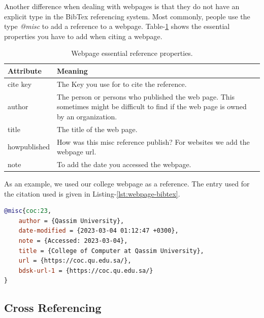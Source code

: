 Another difference when dealing with webpages is that they do not have an explicit type in the BibTex referencing system. Most commonly, people use the type \emph{@misc} to add a reference to a webpage. Table-\ref{tab:webpage-properties} shows the essential properties you have to add when citing a webpage. 

\begin{table}[H]
    \centering
    \begin{tabular}{p{}p{}}
        \hline\hline
        Attribute      & Meaning \\ \hline\hline
        cite key  & The Key you use for to cite the reference.  \\
        author & The person or persons who published the web page. This sometimes might be difficult to find if the web page is owned by an organization. \\
        title & The title of the web page. \\
        howpublished & How was this misc reference publish? For websites we add the webpage url. \\
        note & To add the date you accessed the webpage. \\ \hline
    \end{tabular}
    \caption{Webpage essential reference properties.}
    \label{tab:webpage-properties}
\end{table}

As an example, we used our college webpage \cite{coc:23} as a reference. The entry used for the citation used is given in Listing-\ref{lst:webpage-bibtex}.

\begin{lstlisting}[language=BibTex,style=mystyle,caption={Sample BibTex Reference for A Webpage},label={lst:webpage-bibtex}]
@misc{coc:23,
    author = {Qassim University},
    date-modified = {2023-03-04 01:12:47 +0300},
    note = {Accessed: 2023-03-04},
    title = {College of Computer at Qassim University},
    url = {https://coc.qu.edu.sa/},
    bdsk-url-1 = {https://coc.qu.edu.sa/}
}
\end{lstlisting}

\subsection{Cross Referencing}
\label{sub:cross_referencing}

